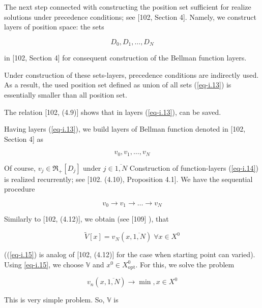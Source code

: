 \documentclass{article}
\begin{document}
The next step connected with constructing the position set
sufficient for realize solutions
under precedence conditions;
see
[102, Section 4].  %
Namely,
we construct layers of position space:
the sets

\begin{equation}
  \label{eq-i.13}
  D_0, D_1, \dots , D_N
\end{equation}

in
[102, Section 4]  %
for consequent construction of the Bellman function layers.

Under construction of these sets-layers,
precedence conditions are indirectly used.
As a result,
the used position set defined as union of all sets (\ref{eq-i.13})
is essentially smaller than all position set.

The relation
[102, (4.9)]  %
shows that in layers (\ref{eq-i.13}),
can be saved.

Having layers (\ref{eq-i.13}),
we build layers of Bellman function denoted in
[102, Section 4]  %
as

\begin{equation}
  \label{eq-i.14}
  v_0, v_1, \dots , v_N
\end{equation}

Of course,
$v_j \in \mathfrak R_+[D_j]$
under
$j \in \overline{1,N}$
Construction of function-layers (\ref{eq-i.14})
is realized recurrently;
see
[102. (4.10), Proposition 4.1].   %
We have the sequential procedure

\begin{equation*}
  v_0 \to v_1 \to \dots \to v_N
\end{equation*}

Similarly to
[102, (4.12)], %
we obtain
(see
[109] %
),
that

\begin{equation}
  \label{eq-i.15}
  \tilde{V}[x] = v_N(x, \overline{1,N})
  \;
  \forall x \in X^0
\end{equation}

((\ref{eq-i.15})
is analog of
[102, (4.12)]   %
for the case when starting point can varied).
Using \ref{eq-i.15},
we choose
$\mathbb V$
and
$x^0 \in X^0_{\mathrm{opt}}$.
For this,
we solve the problem

\begin{equation}
  \label{eq-i.16}
  v_n(x, \overline{1,N}) \to \min,
  x \in X^0
\end{equation}

This is very simple problem.
So,
$\mathbb V$
is
\end{document}
